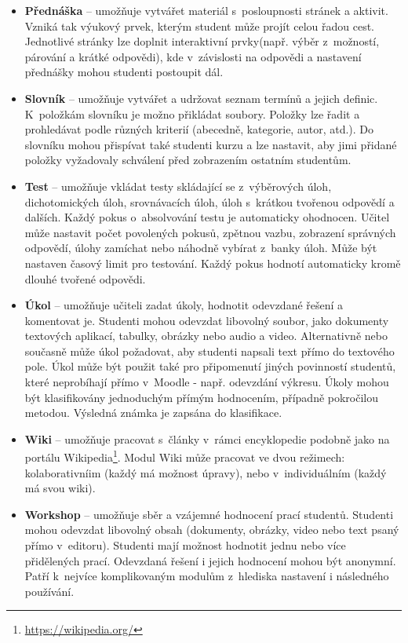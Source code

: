 \documentclass[
print,
  11pt,
  table,   
  nolof,    
  nolot,
  oneside,final
]{fithesis3}
\begin{document}
\begin{itemize}
\item \textbf{Přednáška} -- umožňuje vytvářet materiál s~posloupnosti stránek a aktivit. Vzniká tak výukový prvek, kterým student může projít celou řadou cest. Jednotlivé stránky lze doplnit interaktivní prvky(např. výběr z~možností, párování a krátké odpovědi), kde v~závislosti na odpovědi a nastavení přednášky mohou studenti postoupit dál.

\item \textbf{Slovník} -- umožňuje vytvářet a udržovat seznam termínů a jejich definic. K~položkám slovníku je možno přikládat soubory. Položky lze  řadit a prohledávat podle různých kriterií (abecedně, kategorie, autor, atd.). Do slovníku mohou přispívat také studenti kurzu a lze nastavit, aby jimi přidané položky vyžadovaly schválení před zobrazením ostatním studentům.

\item \textbf{Test} -- umožňuje vkládat testy skládající se z~výběrových úloh, dichotomických úloh, srovnávacích úloh, úloh s~krátkou tvořenou odpovědí a dalších. Každý pokus o~absolvování testu je automaticky ohodnocen. Učitel může nastavit počet povolených pokusů, zpětnou vazbu, zobrazení správných odpovědí, úlohy zamíchat nebo náhod\-ně vybírat z~banky úloh. Může být nastaven časový limit pro testování. Každý pokus hodnotí automaticky kromě dlouhé tvořené odpovědi.

\item \textbf{Úkol} -- umožňuje učiteli zadat úkoly, hodnotit odevzdané řešení a komentovat je. Studenti mohou odevzdat libovolný soubor, jako dokumenty textových aplikací, tabulky, obrázky nebo audio a video. Alternativně nebo současně může úkol požadovat, aby studenti napsali text přímo do textového pole. Úkol může být použit také pro připomenutí jiných povinností studentů, které neprobíhají přímo v~Moodle - např. odevzdání výkresu. Úkoly mohou být klasifikovány jednoduchým přímým hodnocením, případně pokročilou metodou. Výsledná známka je zapsána do klasifikace.

\item \textbf{Wiki} -- umožňuje pracovat s~články v~rámci encyklopedie podobně jako na portálu Wikipedia\footnote{\url{https://wikipedia.org/}}. Modul Wiki může pracovat ve dvou režimech: kolaborativníim (každý má možnost úpravy), nebo v~individuálním (každý má svou wiki).

\item \textbf{Workshop} -- umožňuje sběr a vzájemné hodnocení prací studentů. Studenti mohou odevzdat libovolný obsah (dokumenty, obrázky, video nebo text psaný přímo v~editoru). Studenti mají možnost hodnotit jednu nebo více přidělených prací. Odevzdaná řešení i jejich hodnocení mohou být anonymní. Patří k~nejvíce komplikovaným modulům z~hlediska nastavení i následného používání.
\end{itemize}
\end{document}
